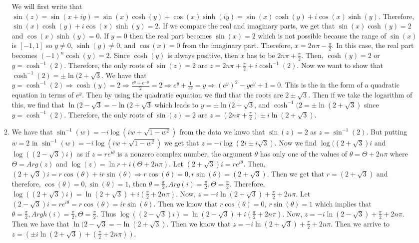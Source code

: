 \documentclass{article}
\theoremstyle{definition}
\begin{document}
\begin{enumerate}
\begin{enumerate}
        We will first write that $\sin(z) = \sin(x + iy) = \sin(x)\cosh(y) + \cos(x)\sinh(iy) = \sin(x)\cosh(y) + i\cos(x)\sinh(y).$ Therefore, $\sin(x)\cosh(y) + i\cos(x)\sinh(y) = 2$. If we compare the real and imaginary parts, we get that $\sin(x)\cosh(y) = 2$ and $\cos(x)\sinh(y) = 0$. If $y = 0$ then the real part becomes $\sin(x) = 2$ which is not possible because the range of $\sin(x)$ is $[-1, 1]$ so $y \neq 0$, $\sinh(y) \neq 0$, and $\cos(x) = 0$ from the imaginary part. Therefore, $x = 2n\pi - \frac{\pi}{2}$. In this case, the real part becomes $(-1)^n\cosh(y) = 2$. Since $\cosh(y)$ is always positive, then $x$ has to be $2n\pi + \frac{\pi}{2}$. Then, $\cosh(y) = 2$ or $y = \cosh^{-1}(2)$. Therefore, the only roots of $\sin(z) = 2$ are $z = 2n\pi + \frac{\pi}{2} + i\cosh^{-1}(2).$ Now we want to show that $\cosh^{-1}(2) = \pm \ln(2 + \sqrt{3}$. We have that $y = \cosh^{-1}(2) \Rightarrow \cosh(y) = 2 \Rightarrow \frac{e^y + e^{-y}}{2} = 2 \Rightarrow e^y + \frac{1}{e^y} = y \Rightarrow (e^y)^2 - ye^y + 1 = 0$. This is the in the form of a quadratic equation in terms of $e^y$. Then by using the quadratic equation we find that the roots are $2 \pm \sqrt{3}$. Then if we take the logarithm of this, we find that $\ln(2 - \sqrt{3} = -\ln(2 + \sqrt{3}$ which leads to $y = \pm \ln(2 + \sqrt{3}$, and $\cosh^{-1}(2 = \pm\ln(2 + \sqrt{3})$ since $y = \cosh^{-1}(2).$ Therefore, the only roots of $\sin(z) = 2$ are $z = (2n\pi + \frac{\pi}{2}) \pm i\ln(2 + \sqrt{3})$.
        
        \item
        
        We have that $\sin^{-1}(w) = -i\log(iw + \sqrt{1 - w^2})$ from the data we knwo that $\sin(z) = 2$ as $z = \sin^{-1}(2)$. But putting $w = 2$ in $\sin^{-1}(w) = -i\log(iw + \sqrt{1 - w^2})$ we get that $z = -i\log(2i \pm i\sqrt{3})$. Now we find $\log((2 + \sqrt{3})i$ and $\log((2 - \sqrt{3})i)$ as if $z = re^{i\theta}$ is a nonzero complex number, the argument $\theta$ has only one of the values of $\theta = \Theta + 2n\pi$ where $\Theta = Arg(z)$ and $\log(z) = \ln r + i(\Theta + 2n\pi)$. Let $(2 + \sqrt{3})i = re^{i\theta}.$ Then, $(2 + \sqrt{3})i = r\cos(\theta) + ir\sin(\theta) \Rightarrow r\cos(\theta) = 0, r\sin(\theta) = (2 + \sqrt{3})$. Then we get that $r = (2 + \sqrt{3})$ and therefore, $\cos(\theta) = 0, \sin(\theta) = 1$, then $\theta = \frac{\pi}{2}, Arg(i) = \frac{\pi}{2}, \Theta = \frac{\pi}{2}$. Therefore, $\log((2 + \sqrt{3}) i) = \ln(2 + \sqrt{3}) + i(\frac{\pi}{2} + 2n\pi)$. Now, $z = -i\ln(2 + \sqrt{3}) + \frac{\pi}{2} + 2n\pi$. Let $(2-\sqrt{3})i = re^{i\theta} = r\cos(\theta) = ir\sin(\theta)$. Then we know that $r\cos(\theta) = 0$, $r\sin(\theta) = 1$ which implies that $\theta = \frac{\pi}{2}, Argh(i) = \frac{\pi}{2}, \Theta = \frac{\pi}{2}$. Thus $\log((2 - \sqrt{3})i) = \ln(2 - \sqrt{3}) + i(\frac{\pi}{2} + 2n\pi)$. Now, $z = -i \ln(2 - \sqrt{3}) + \frac{\pi}{2} + 2n\pi$. Then we have that $\ln(2 - \sqrt{3} = -\ln(2 + \sqrt{3})$. Then we know that $z = -i\ln(2 + \sqrt{3}) + \frac{\pi}{2} + 2n\pi$. Then we arrive to $z = (\pm i \ln(2 + \sqrt{3}) + (\frac{\pi}{2} + 2n\pi)).$
        

\end{enumerate}
\end{enumerate}
\end{document}
